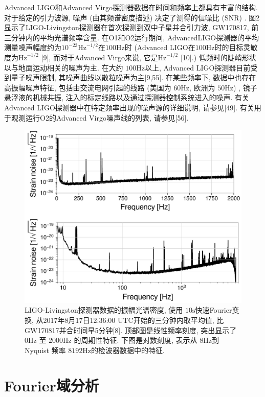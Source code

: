 \documentclass[a4paper]{\documentclassname}
\def\t{\text}
\theoremstyle{definition}
\begin{document}
Advanced LIGO和Advanced Virgo探测器数据在时间和频率上都具有丰富的结构. 对于给定的引力波源, 噪声 (由其频谱密度描述) 决定了测得的信噪比 (SNR) . 图2显示了LIGO-Livingston探测器在首次探测到双中子星并合引力波, GW170817, 前三分钟内的平均光谱频率含量. 在O1和O2运行期间, AdvancedLIGO探测器的平均测量噪声幅度约为$10^{-23}\t{Hz}^{-1/2}$在$100 \t{Hz}$时 (Advanced LIGO在$100 \t{Hz}$时的目标灵敏度为$\t{Hz}^{-1/2}$ [9], 而对于Advanced Virgo来说, 它是$\t{Hz}^{-1/2}$ [10].)  低频时的陡峭形状以与地面运动相关的噪声为主. 在大约 $100\t{Hz}$以上, Advanced LIGO探测器目前受到量子噪声限制, 其噪声曲线以散粒噪声为主[9,55]. 在某些频率下, 数据中也存在高振幅噪声特征, 包括由交流电网引起的线路 (美国为  $60\t{Hz}$, 欧洲为  $50\t{Hz}$) , 镜子悬浮液的机械共振, 注入的标定线路以及通过探测器控制系统进入的噪声. 有关Advanced LIGO探测器中在特定频率出现的噪声源的详细说明, 请参见[49]. 有关用于观测运行O2的Advanced Virgo噪声线的列表, 请参见[56]. 
\begin{figure}[htbp]
    \centering
    \includegraphics{img/2.jpg}
    \caption{
        LIGO-Livingston探测器数据的振幅光谱密度, 使用 $10\t{s}$快速Fourier变换, 从2017年8月17日12:36:00 UTC开始的三分钟内取平均值, 比GW170817并合时间早5分钟[8]. 顶部图是线性频率刻度, 突出显示了  $0\t{Hz}$ 至  $2000\t{Hz}$ 的周期性特征. 下图是对数刻度, 表示从 $8\t{Hz}$到Nyquist 频率 $8192\t{Hz}$的检波器数据中的特征. 
    }
\end{figure}

\section{Fourier域分析}
\end{document}
